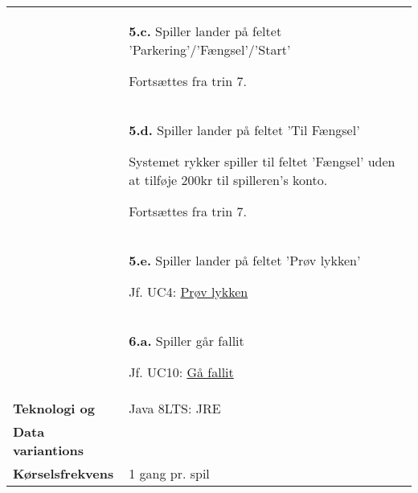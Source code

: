 \documentclass[class=article, crop=false]{standalone}
\begin{document}
    \begin{table}[H]
        \begin{tabularx}{\textwidth}{|l|X|}
            \hline




            & \textbf{5.c.} Spiller lander på feltet 'Parkering'/'Fængsel'/'Start'
            \begin{enumerate} \begin{tabenum}
                                  \item Fortsættes fra trin 7.
            \end{tabenum} \end{enumerate}
            \\


            & \textbf{5.d.} Spiller lander på feltet 'Til Fængsel'
            \begin{enumerate} \begin{tabenum}
                                  \item Systemet rykker spiller til feltet 'Fængsel' uden at tilføje 200kr til spilleren's konto.
                                  \item Fortsættes fra trin 7.
            \end{tabenum} \end{enumerate}
            \\


            & \textbf{5.e.} Spiller lander på feltet 'Prøv lykken'
            \begin{enumerate} \begin{tabenum}
                                  \item Jf. UC4: \underline{Prøv lykken}
            \end{tabenum} \end{enumerate}
            \\

            & \textbf{6.a.} Spiller går fallit
            \begin{enumerate} \begin{tabenum}
                                  \item Jf. UC10: \underline{Gå fallit}
            \end{tabenum} \end{enumerate}
            \\


            \hline








            \textbf{Teknologi og}     & Java 8LTS: JRE \\
            \textbf{Data variantions} &  \\ \hline
            \textbf{Kørselsfrekvens} & 1 gang pr. spil\\ \hline
        \end{tabularx}


    \end{table}
\end{document}
